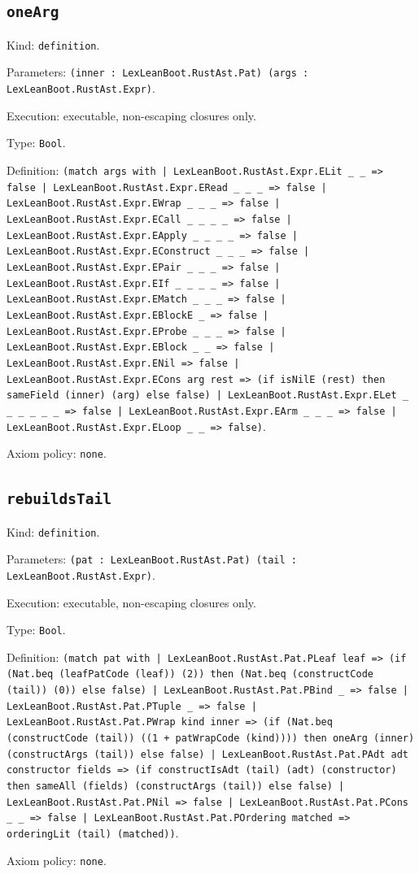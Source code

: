 \documentclass[11pt]{article}
\begin{document}
\subsection*{\texttt{oneArg}}
\noindent Kind: \texttt{definition}.\par
\noindent Parameters: \texttt{(inner : LexLeanBoot.RustAst.Pat) (args : LexLeanBoot.RustAst.Expr)}.\par
\noindent Execution: executable, non-escaping closures only.\par
\noindent Type: \texttt{Bool}.\par
\noindent Definition: \texttt{(match args with | LexLeanBoot.RustAst.Expr.ELit \_ \_ => false | LexLeanBoot.RustAst.Expr.ERead \_ \_ \_ => false | LexLeanBoot.RustAst.Expr.EWrap \_ \_ \_ => false | LexLeanBoot.RustAst.Expr.ECall \_ \_ \_ \_ => false | LexLeanBoot.RustAst.Expr.EApply \_ \_ \_ \_ => false | LexLeanBoot.RustAst.Expr.EConstruct \_ \_ \_ => false | LexLeanBoot.RustAst.Expr.EPair \_ \_ \_ => false | LexLeanBoot.RustAst.Expr.EIf \_ \_ \_ \_ => false | LexLeanBoot.RustAst.Expr.EMatch \_ \_ \_ => false | LexLeanBoot.RustAst.Expr.EBlockE \_ => false | LexLeanBoot.RustAst.Expr.EProbe \_ \_ \_ => false | LexLeanBoot.RustAst.Expr.EBlock \_ \_ => false | LexLeanBoot.RustAst.Expr.ENil => false | LexLeanBoot.RustAst.Expr.ECons arg rest => (if isNilE (rest) then sameField (inner) (arg) else false) | LexLeanBoot.RustAst.Expr.ELet \_ \_ \_ \_ \_ \_ => false | LexLeanBoot.RustAst.Expr.EArm \_ \_ \_ => false | LexLeanBoot.RustAst.Expr.ELoop \_ \_ => false)}.\par
\noindent Axiom policy: \texttt{none}.\par
\subsection*{\texttt{rebuildsTail}}
\noindent Kind: \texttt{definition}.\par
\noindent Parameters: \texttt{(pat : LexLeanBoot.RustAst.Pat) (tail : LexLeanBoot.RustAst.Expr)}.\par
\noindent Execution: executable, non-escaping closures only.\par
\noindent Type: \texttt{Bool}.\par
\noindent Definition: \texttt{(match pat with | LexLeanBoot.RustAst.Pat.PLeaf leaf => (if (Nat.beq (leafPatCode (leaf)) (2)) then (Nat.beq (constructCode (tail)) (0)) else false) | LexLeanBoot.RustAst.Pat.PBind \_ => false | LexLeanBoot.RustAst.Pat.PTuple \_ => false | LexLeanBoot.RustAst.Pat.PWrap kind inner => (if (Nat.beq (constructCode (tail)) ((1 + patWrapCode (kind)))) then oneArg (inner) (constructArgs (tail)) else false) | LexLeanBoot.RustAst.Pat.PAdt adt constructor fields => (if constructIsAdt (tail) (adt) (constructor) then sameAll (fields) (constructArgs (tail)) else false) | LexLeanBoot.RustAst.Pat.PNil => false | LexLeanBoot.RustAst.Pat.PCons \_ \_ => false | LexLeanBoot.RustAst.Pat.POrdering matched => orderingLit (tail) (matched))}.\par
\noindent Axiom policy: \texttt{none}.\par
\end{document}
